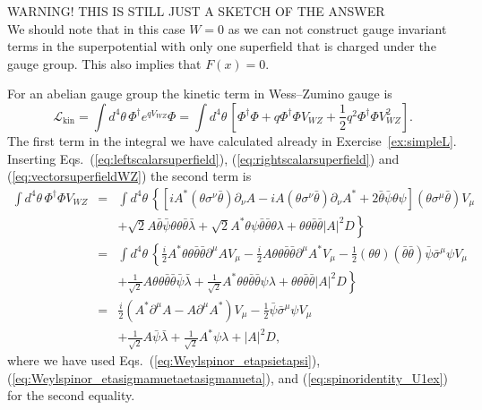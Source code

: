 \documentclass[notes.tex]{subfiles}
\begin{document}
\begin{Answer}
WARNING! THIS IS STILL JUST A SKETCH OF THE ANSWER\\
We should note that in this case $W=0$ as we can not construct gauge invariant terms in the superpotential with only one superfield that is charged under the gauge group. This also implies that $F(x)=0$.

For an abelian gauge group the kinetic term in Wess--Zumino gauge is
\begin{equation}
\mathcal L_\text{kin} =\int d^4\theta \,\Phi^\dagger e^{qV_{WZ}}\Phi=\int d^4\theta \, \left[\Phi^\dagger \Phi+ q\Phi^\dagger \Phi V_{WZ}+\frac{1}{2} q^2\Phi^\dagger \Phi V_{WZ}^2\right].
\end{equation}
The first term in the integral we have calculated already in Exercise~\ref{ex:simpleL}.  Inserting Eqs.~(\ref{eq:leftscalarsuperfield}), (\ref{eq:rightscalarsuperfield}) and (\ref{eq:vectorsuperfieldWZ}) the second term is
\begin{eqnarray}
\int d^4\theta \, \Phi^\dagger \Phi V_{WZ} &=&
 \int d^4\theta \, \left\{ [iA^*(\theta\sigma^\nu \bar{\theta})\partial_\nu A - iA(\theta\sigma^\nu \bar{\theta})\partial_\nu A^*+  2\bar{\theta}\bar{\psi}\theta \psi] (\theta\sigma^\mu \bar{\theta})V_\mu \right.   \nonumber \\
&&\left. + \sqrt{2}A \bar{\theta}\bar\psi  \theta\theta\bar{\theta}\bar{\lambda} + \sqrt{2}A^*\theta \psi \bar{\theta}\bar{\theta}\theta\lambda  +\theta\theta\bar{\theta}\bar{\theta}|A|^2D \right\}  \nonumber \\
&=& \int d^4\theta \, \left\{ \frac{i}{2} A^* \theta\theta\bar{\theta}\bar{\theta}\partial^\mu A V_\mu- \frac{i}{2}A \theta\theta\bar{\theta}\bar{\theta}\partial^\mu A^*V_\mu -\frac{1}{2}(\theta\theta)(\bar\theta\bar\theta)\bar\psi\bar\sigma^\mu\psi V_\mu \right.  \nonumber \\
&& \left. + \frac{1}{\sqrt{2}}A\theta\theta\bar\theta\bar\theta\bar\psi\bar\lambda +  \frac{1}{\sqrt{2}} A^*\theta\theta\bar\theta\bar\theta\psi \lambda +\theta\theta\bar{\theta}\bar{\theta}|A|^2D \right\} \nonumber \\
&=&  \frac{i}{2} ( A^*\partial^\mu A- A\partial^\mu A^* )V_\mu -\frac{1}{2}\bar\psi\bar\sigma^\mu\psi V_\mu \nonumber \\
&& + \frac{1}{\sqrt{2}}A\bar\psi\bar\lambda +  \frac{1}{\sqrt{2}} A^*\psi \lambda +|A|^2D,
\end{eqnarray}
where we have used Eqs.~(\ref{eq:Weylspinor_etapsietapsi}), (\ref{eq:Weylspinor_etasigmamuetaetasigmanueta}), and (\ref{eq:spinoridentity_U1ex})
for the second equality.


\end{Answer}
\end{document}
